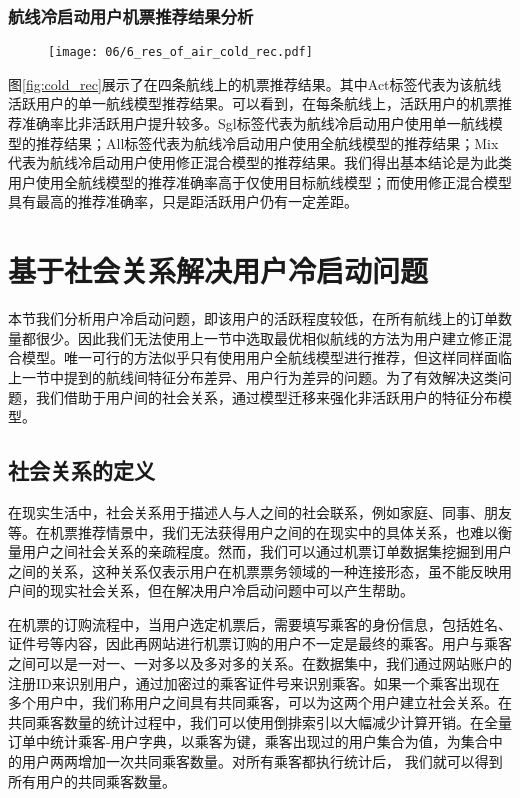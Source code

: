 \subsubsection{航线冷启动用户机票推荐结果分析}

\begin{figure}
 \centering
 \texttt{[image: 06/6\_res\_of\_air\_cold\_rec.pdf]}
\end{figure}

图\ref{fig:cold_rec}展示了在四条航线上的机票推荐结果。其中Act标签代表为该航线活跃用户的单一航线模型推荐结果。可以看到，在每条航线上，活跃用户的机票推荐准确率比非活跃用户提升较多。Sgl标签代表为航线冷启动用户使用单一航线模型的推荐结果；All标签代表为航线冷启动用户使用全航线模型的推荐结果；Mix代表为航线冷启动用户使用修正混合模型的推荐结果。我们得出基本结论是为此类用户使用全航线模型的推荐准确率高于仅使用目标航线模型；而使用修正混合模型具有最高的推荐准确率，只是距活跃用户仍有一定差距。


\section{基于社会关系解决用户冷启动问题}

本节我们分析用户冷启动问题，即该用户的活跃程度较低，在所有航线上的订单数量都很少。因此我们无法使用上一节中选取最优相似航线的方法为用户建立修正混合模型。唯一可行的方法似乎只有使用用户全航线模型进行推荐，但这样同样面临上一节中提到的航线间特征分布差异、用户行为差异的问题。为了有效解决这类问题，我们借助于用户间的社会关系，通过模型迁移来强化非活跃用户的特征分布模型。


\subsection{社会关系的定义}
在现实生活中，社会关系用于描述人与人之间的社会联系，例如家庭、同事、朋友等。在机票推荐情景中，我们无法获得用户之间的在现实中的具体关系，也难以衡量用户之间社会关系的亲疏程度。然而，我们可以通过机票订单数据集挖掘到用户之间的关系，这种关系仅表示用户在机票票务领域的一种连接形态，虽不能反映用户间的现实社会关系，但在解决用户冷启动问题中可以产生帮助。

在机票的订购流程中，当用户选定机票后，需要填写乘客的身份信息，包括姓名、证件号等内容，因此再网站进行机票订购的用户不一定是最终的乘客。用户与乘客之间可以是一对一、一对多以及多对多的关系。在数据集中，我们通过网站账户的注册ID来识别用户，通过加密过的乘客证件号来识别乘客。如果一个乘客出现在多个用户中，我们称用户之间具有共同乘客，可以为这两个用户建立社会关系。在共同乘客数量的统计过程中，我们可以使用倒排索引以大幅减少计算开销。在全量订单中统计乘客-用户字典，以乘客为键，乘客出现过的用户集合为值，为集合中的用户两两增加一次共同乘客数量。对所有乘客都执行统计后，
我们就可以得到所有用户的共同乘客数量。

